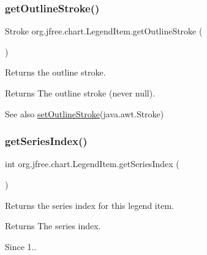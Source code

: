 \subsubsection{\texorpdfstring{get\+Outline\+Stroke()}{getOutlineStroke()}}
{\footnotesize\ttfamily Stroke org.\+jfree.\+chart.\+Legend\+Item.\+get\+Outline\+Stroke (\begin{DoxyParamCaption}{ }\end{DoxyParamCaption})}

Returns the outline stroke.

\begin{DoxyReturn}{Returns}
The outline stroke (never {\ttfamily null}).
\end{DoxyReturn}
\begin{DoxySeeAlso}{See also}
\mbox{\hyperlink{classorg_1_1jfree_1_1chart_1_1_legend_item_a3a376b04acc776e2973de9f737713239}{set\+Outline\+Stroke}}(java.\+awt.\+Stroke) 
\end{DoxySeeAlso}
\mbox{\label{classorg_1_1jfree_1_1chart_1_1_legend_item_add79196ffb656e092e5f8f5965dbc364}} 
\subsubsection{\texorpdfstring{get\+Series\+Index()}{getSeriesIndex()}}
{\footnotesize\ttfamily int org.\+jfree.\+chart.\+Legend\+Item.\+get\+Series\+Index (\begin{DoxyParamCaption}{ }\end{DoxyParamCaption})}

Returns the series index for this legend item.

\begin{DoxyReturn}{Returns}
The series index.
\end{DoxyReturn}
\begin{DoxySince}{Since}
1.. 
\end{DoxySince}
\mbox{\label{classorg_1_1jfree_1_1chart_1_1_legend_item_ad46fd38c171d5dc28937401079a447c7}} 
